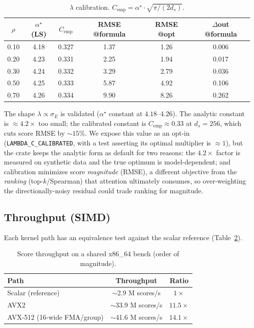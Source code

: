 \documentclass[11pt]{article}
\theoremstyle{plain}
\theoremstyle{definition}
\newcommand{\ds}{d_s}
\newcommand{\sigE}{\sigma_E}
\begin{document}
\begin{table}[t]
\centering
\caption{$\lambda$ calibration. $C_{\text{emp}} = \alpha^\star
\cdot \sqrt{\pi/(2\ds)}$.}
\label{tab:calib}
\small
\begin{tabular}{@{}cccccc@{}}
\toprule
$\rho$ & $\alpha^\star$ (LS) & $C_{\text{emp}}$ & RMSE @formula & RMSE @opt & $\Delta$out @formula \\
\midrule
0.10 & 4.18 & 0.327 & 1.37 & 1.26 & 0.006 \\
0.20 & 4.23 & 0.331 & 2.25 & 1.94 & 0.017 \\
0.30 & 4.24 & 0.332 & 3.29 & 2.79 & 0.036 \\
0.50 & 4.25 & 0.333 & 5.87 & 4.92 & 0.106 \\
0.70 & 4.26 & 0.334 & 9.90 & 8.26 & 0.262 \\
\bottomrule
\end{tabular}
\end{table}

The shape $\lambda \propto \sigE$ is validated ($\alpha^\star$ constant
at $4.18$--$4.26$). The analytic constant is $\approx 4.2\times$ too
small; the calibrated constant is $C_{\text{emp}} \approx 0.33$ at
$\ds=256$, which cuts score RMSE by $\sim 15\%$. We expose this value as
an opt-in (\texttt{LAMBDA\_C\_CALIBRATED}, with a test asserting its
optimal multiplier is $\approx 1$), but the crate keeps the analytic form
as default for two reasons: the $4.2\times$ factor is measured on
synthetic data and the true optimum is model-dependent; and calibration
minimizes score \emph{magnitude} (RMSE), a different objective from the
\emph{ranking} (top-$k$/Spearman) that attention ultimately consumes, so
over-weighting the directionally-noisy residual could trade ranking for
magnitude.

\subsection{Throughput (SIMD)}
\label{sec:throughput}
Each kernel path has an equivalence test against the scalar reference
(Table~\ref{tab:simd}).

\begin{table}[t]
\centering
\caption{Score throughput on a shared x86\_64 bench (order of
magnitude).}
\label{tab:simd}
\small
\begin{tabular}{@{}lcc@{}}
\toprule
Path & Throughput & Ratio \\
\midrule
Scalar (reference)          & $\sim$2.9 M scores/s  & $1\times$ \\
AVX2                        & $\sim$33.9 M scores/s & $\mathbf{11.5\times}$ \\
AVX-512 (16-wide FMA/group) & $\sim$41.6 M scores/s & $\mathbf{14.1\times}$ \\
\bottomrule
\end{tabular}
\end{table}
\end{document}
